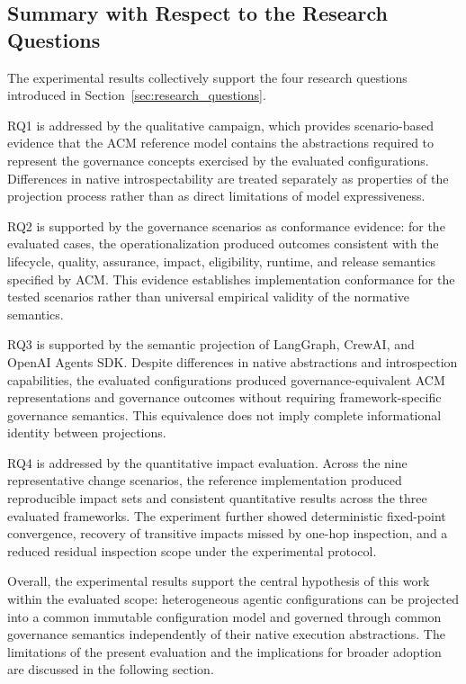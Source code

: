 \documentclass[10pt]{article}
\begin{document}
\subsection{Summary with Respect to the Research Questions}
\label{sec:rq_summary}

The experimental results collectively support the four research questions introduced in Section~\ref{sec:research_questions}.

RQ1 is addressed by the qualitative campaign, which provides scenario-based evidence that the ACM reference model contains the abstractions required to represent the governance concepts exercised by the evaluated configurations. Differences in native introspectability are treated separately as properties of the projection process rather than as direct limitations of model expressiveness.

RQ2 is supported by the governance scenarios as conformance evidence: for the evaluated cases, the operationalization produced outcomes consistent with the lifecycle, quality, assurance, impact, eligibility, runtime, and release semantics specified by ACM. This evidence establishes implementation conformance for the tested scenarios rather than universal empirical validity of the normative semantics. 

RQ3 is supported by the semantic projection of LangGraph, CrewAI, and OpenAI Agents SDK. Despite differences in native abstractions and introspection capabilities, the evaluated configurations produced governance-equivalent ACM representations and governance outcomes without requiring framework-specific governance semantics. This equivalence does not imply complete informational identity between projections. 

RQ4 is addressed by the quantitative impact evaluation. Across the nine representative change scenarios, the reference implementation produced reproducible impact sets and consistent quantitative results across the three evaluated frameworks. The experiment further showed deterministic fixed-point convergence, recovery of transitive impacts missed by one-hop inspection, and a reduced residual inspection scope under the experimental protocol.

Overall, the experimental results support the central hypothesis of this work within the evaluated scope: heterogeneous agentic configurations can be projected into a common immutable configuration model and governed through common governance semantics independently of their native execution abstractions. The limitations of the present evaluation and the implications for broader adoption are discussed in the following section.
\end{document}
